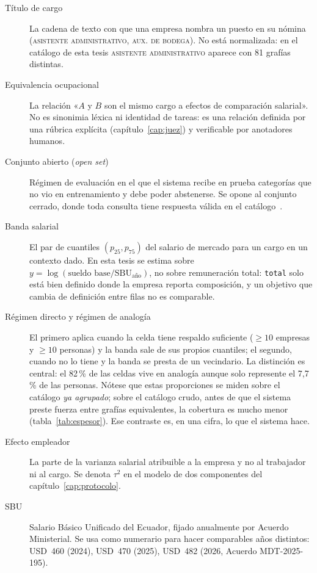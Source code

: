 \documentclass[12pt,a4paper,oneside]{report}
\begin{document}
\begin{description}

  \item[Título de cargo] La cadena de texto con que una empresa nombra un puesto en su
  nómina (\textsc{asistente administrativo}, \textsc{aux. de bodega}). No está
  normalizada: en el catálogo de esta tesis \textsc{asistente administrativo} aparece con
  81 grafías distintas.

  \item[Equivalencia ocupacional] La relación «$A$ y $B$ son el mismo cargo a efectos de
  comparación salarial». No es sinonimia léxica ni identidad de tareas: es una relación
  definida por una rúbrica explícita (capítulo~\ref{cap:juez}) y verificable por
  anotadores humanos.

  \item[Conjunto abierto (\emph{open set})] Régimen de evaluación en el que el sistema
  recibe en prueba categorías que no vio en entrenamiento y debe poder abstenerse. Se
  opone al conjunto cerrado, donde toda consulta tiene respuesta válida en el
  catálogo~\cite{geng2021openset}.

  \item[Banda salarial] El par de cuantiles $(p_{25}, p_{75})$ del salario de mercado para
  un cargo en un contexto dado. En esta tesis se estima sobre
  $y = \log(\text{sueldo base} / \text{SBU}_{\text{año}})$, no sobre remuneración total:
  \texttt{total} solo está bien definido donde la empresa reporta composición, y un
  objetivo que cambia de definición entre filas no es comparable.

  \item[Régimen directo y régimen de analogía] El primero aplica cuando la celda tiene
  respaldo suficiente ($\geq 10$ empresas y $\geq 10$ personas) y la banda sale de sus
  propios cuantiles; el segundo, cuando no lo tiene y la banda se presta de un vecindario.
  La distinción es central: el 82\,\% de las celdas vive en analogía aunque solo
  represente el 7,7\,\% de las personas. Nótese que estas proporciones se miden sobre el
  catálogo \emph{ya agrupado}; sobre el catálogo crudo, antes de que el sistema preste
  fuerza entre grafías equivalentes, la cobertura es mucho menor
  (tabla~\ref{tab:espesor}). Ese contraste es, en una cifra, lo que el sistema hace.

  \item[Efecto empleador] La parte de la varianza salarial atribuible a la empresa y no al
  trabajador ni al cargo. Se denota $\tau^2$ en el modelo de dos componentes del
  capítulo~\ref{cap:protocolo}.

  \item[SBU] Salario Básico Unificado del Ecuador, fijado anualmente por Acuerdo
  Ministerial. Se usa como numerario para hacer comparables años distintos:
  USD~460 (2024), USD~470 (2025), USD~482 (2026, Acuerdo MDT-2025-195).

\end{description}
\end{document}

